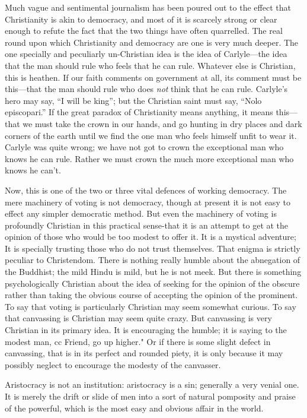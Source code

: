 \documentclass{book}
\begin{document}
Much vague and sentimental journalism has been poured out to the effect that Christianity is akin to democracy, and most of it is scarcely strong or clear enough to refute the fact that the two things have often quarrelled. The real round upon which Christianity and democracy are one is very much deeper. The one specially and peculiarly un-Christian idea is the idea of Carlyle—the idea that the man should rule who feels that he can rule. Whatever else is Christian, this is heathen. If our faith comments on government at all, its comment must be this—that the man should rule who does \emph{not} think that he can rule. Carlyle’s hero may say, “I will be king”; but the Christian saint must say, “Nolo episcopari.” If the great paradox of Christianity means anything, it means this—that we must take the crown in our hands, and go hunting in dry places and dark corners of the earth until we find the one man who feels himself unfit to wear it. Carlyle was quite wrong; we have not got to crown the exceptional man who knows he can rule. Rather we must crown the much more exceptional man who knows he can’t.

Now, this is one of the two or three vital defences of working democracy. The mere machinery of voting is not democracy, though at present it is not easy to effect any simpler democratic method. But even the machinery of voting is profoundly Christian in this practical sense-that it is an attempt to get at the opinion of those who would be too modest to offer it. It is a mystical adventure; It is specially trusting those who do not trust themselves. That enigma is strictly peculiar to Christendom. There is nothing really humble about the abnegation of the Buddhist; the mild Hindu is mild, but he is not meek. But there is something psychologically Christian about the idea of seeking for the opinion of the obscure rather than taking the obvious course of accepting the opinion of the prominent. To say that voting is particularly Christian may seem somewhat curious. To say that canvassing is Christian may seem quite crazy. But canvassing is very Christian in its primary idea. It is encouraging the humble; it is saying to the modest man, cc Friend, go up higher." Or if there is some slight defect in canvassing, that is in its perfect and rounded piety, it is only because it may possibly neglect to encourage the modesty of the canvasser.

Aristocracy is not an institution: aristocracy is a sin; generally a very venial one. It is merely the drift or slide of men into a sort of natural pomposity and praise of the powerful, which is the most easy and obvious affair in the world.
\end{document}
